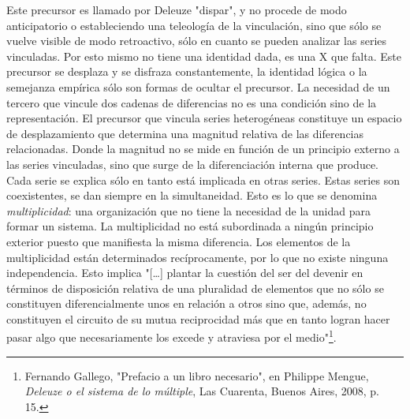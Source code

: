 \documentclass{book}
\begin{document}
Este precursor es llamado por Deleuze "dispar", y no procede de modo
anticipatorio o estableciendo una teleología de la vinculación, sino que
sólo se vuelve visible de modo retroactivo, sólo en cuanto se pueden
analizar las series vinculadas. Por esto mismo no tiene una identidad
dada, es una X que falta. Este precursor se desplaza y se disfraza
constantemente, la identidad lógica o la semejanza empírica sólo son
formas de ocultar el precursor. La necesidad de un tercero que vincule
dos cadenas de diferencias no es una condición sino de la
representación. El precursor que vincula series heterogéneas constituye
un espacio de desplazamiento que determina una magnitud relativa de las
diferencias relacionadas. Donde la magnitud no se mide en función de un
principio externo a las series vinculadas, sino que surge de la
diferenciación interna que produce. Cada serie se explica sólo en tanto
está implicada en otras series. Estas series son coexistentes, se dan
siempre en la simultaneidad. Esto es lo que se denomina
\emph{multiplicidad}: una organización que no tiene la necesidad de la
unidad para formar un sistema. La multiplicidad no está subordinada a
ningún principio exterior puesto que manifiesta la misma diferencia. Los
elementos de la multiplicidad están determinados recíprocamente, por lo
que no existe ninguna independencia. Esto implica "{[}\ldots{]} plantar
la cuestión del ser del devenir en términos de disposición relativa de
una pluralidad de elementos que no sólo se constituyen diferencialmente
unos en relación a otros sino que, además, no constituyen el circuito de
su mutua reciprocidad más que en tanto logran hacer pasar algo que
necesariamente los excede y atraviesa por el medio"\footnote{Fernando
  Gallego, "Prefacio a un libro necesario", en Philippe Mengue,
  \emph{Deleuze o el sistema de lo múltiple}, Las Cuarenta, Buenos
  Aires, 2008, p. 15.}.
\end{document}
